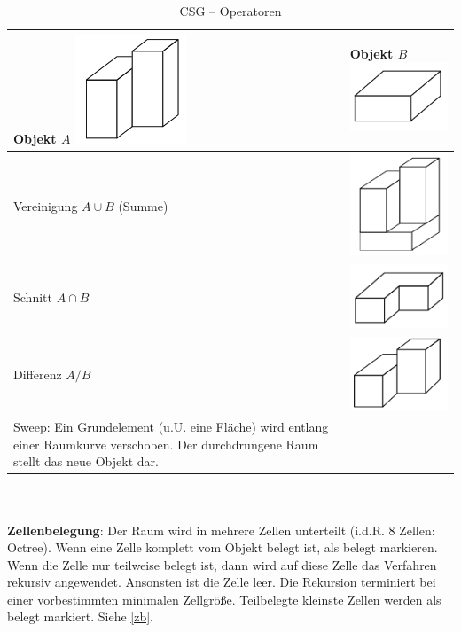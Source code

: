 \begin{table}[!hb]
\centering
\begin{tabular}{|p{6.5cm}|p{6.5cm}|}
\hline
Objekt $A$ \includegraphics[width=.07\textwidth]{figures/ch02_a.png} & Objekt $B$ \includegraphics[width=.07\textwidth]{figures/ch02_b.png}\\
\hline
Vereinigung $A \cup B$ (Summe) & \includegraphics[width=.07\textwidth]{figures/ch02_ab.png}\\
\hline
Schnitt $A \cap B$ & \includegraphics[width=.07\textwidth]{figures/ch02_ab1.png} \\
\hline
Differenz $A / B$ & \includegraphics[width=.07\textwidth]{figures/ch02_ab2.png}\\
\hline
Sweep:
Ein Grundelement (u.U. eine Fläche) wird entlang einer Raumkurve
verschoben. Der durchdrungene Raum stellt das neue Objekt dar. & \\
\hline
\end{tabular}
\caption{CSG -- Operatoren}
\label{tab:csg_ops}
\end{table}\\ \\
\textbf{Zellenbelegung}:
Der Raum wird in mehrere Zellen unterteilt (i.d.R. 8 Zellen: \glqq Octree\grqq).
Wenn eine Zelle komplett vom Objekt belegt ist, als \glqq belegt\grqq{} markieren.
Wenn die Zelle nur teilweise belegt ist, dann wird auf diese Zelle das
Verfahren rekursiv angewendet. Ansonsten ist die Zelle leer.
Die Rekursion terminiert bei einer vorbestimmten minimalen Zellgröße.
Teilbelegte kleinste Zellen werden als belegt markiert. Siehe \autoref{zb}.
